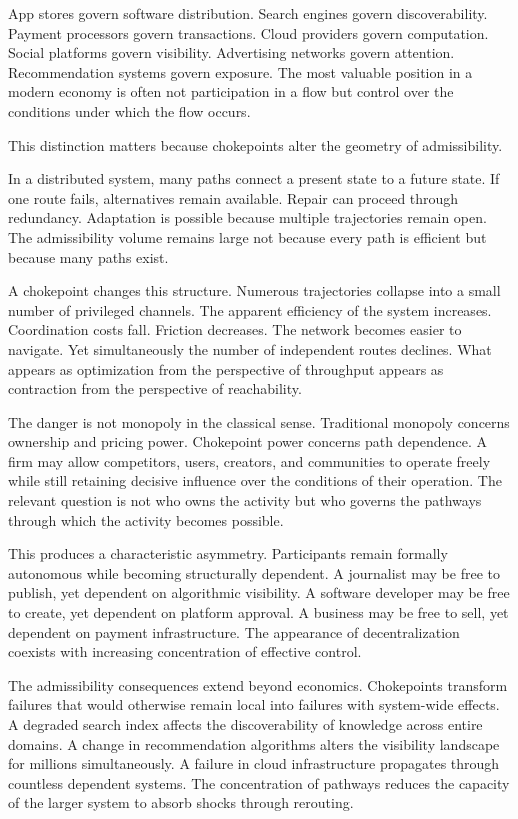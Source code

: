 \documentclass[11pt, letterpaper]{article}
\begin{document}
App stores govern software distribution. Search engines govern discoverability. Payment processors govern transactions. Cloud providers govern computation. Social platforms govern visibility. Advertising networks govern attention. Recommendation systems govern exposure. The most valuable position in a modern economy is often not participation in a flow but control over the conditions under which the flow occurs.

This distinction matters because chokepoints alter the geometry of admissibility.

In a distributed system, many paths connect a present state to a future state. If one route fails, alternatives remain available. Repair can proceed through redundancy. Adaptation is possible because multiple trajectories remain open. The admissibility volume remains large not because every path is efficient but because many paths exist.

A chokepoint changes this structure. Numerous trajectories collapse into a small number of privileged channels. The apparent efficiency of the system increases. Coordination costs fall. Friction decreases. The network becomes easier to navigate. Yet simultaneously the number of independent routes declines. What appears as optimization from the perspective of throughput appears as contraction from the perspective of reachability.

The danger is not monopoly in the classical sense. Traditional monopoly concerns ownership and pricing power. Chokepoint power concerns path dependence. A firm may allow competitors, users, creators, and communities to operate freely while still retaining decisive influence over the conditions of their operation. The relevant question is not who owns the activity but who governs the pathways through which the activity becomes possible.

This produces a characteristic asymmetry. Participants remain formally autonomous while becoming structurally dependent. A journalist may be free to publish, yet dependent on algorithmic visibility. A software developer may be free to create, yet dependent on platform approval. A business may be free to sell, yet dependent on payment infrastructure. The appearance of decentralization coexists with increasing concentration of effective control.

The admissibility consequences extend beyond economics. Chokepoints transform failures that would otherwise remain local into failures with system-wide effects. A degraded search index affects the discoverability of knowledge across entire domains. A change in recommendation algorithms alters the visibility landscape for millions simultaneously. A failure in cloud infrastructure propagates through countless dependent systems. The concentration of pathways reduces the capacity of the larger system to absorb shocks through rerouting.
\end{document}
